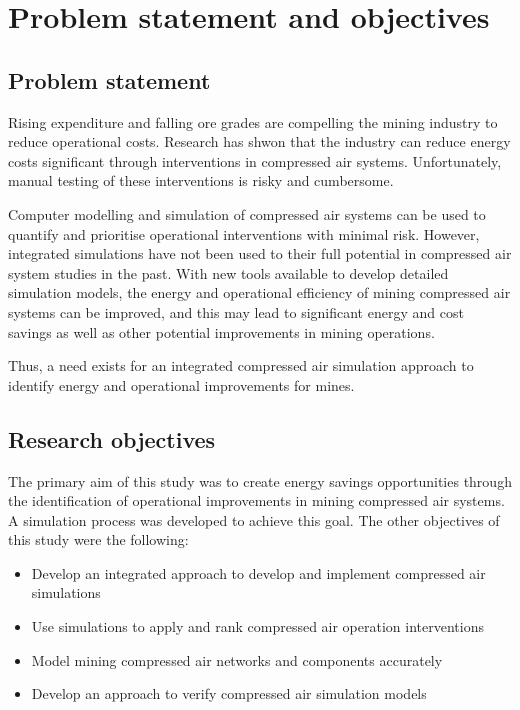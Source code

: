 
\section{Problem statement and objectives}
	\subsection{Problem statement}
 		Rising expenditure and falling ore grades are compelling the mining industry to reduce operational costs. Research has shwon that the industry can reduce energy costs significant through interventions in compressed air systems. Unfortunately, manual testing of these interventions is risky and cumbersome.
 		\par
 		Computer modelling and simulation of compressed air systems can be used to quantify and prioritise operational interventions with minimal risk. However, integrated simulations have not been used to their full potential in compressed air system studies in the past. With new tools available to develop detailed simulation models, the energy and operational efficiency of mining compressed air systems can be improved, and this may lead to significant energy and cost savings as well as other potential improvements in mining operations.
 		\par 
 		Thus, a need exists for an integrated compressed air simulation approach to identify energy and operational improvements for mines.
 			\subsection{Research objectives}
 			
		The primary aim of this study was to create energy savings opportunities through the identification of operational improvements in mining compressed air systems. A simulation process was developed to achieve this goal. The other objectives of this study were the following:
		\begin{itemize}
			\item Develop an integrated approach to develop and implement compressed air simulations
			\item Use simulations to apply and rank compressed air operation interventions
			\item Model mining compressed air networks and components accurately
			\item Develop an approach to verify compressed air simulation models
		\end{itemize}
		
